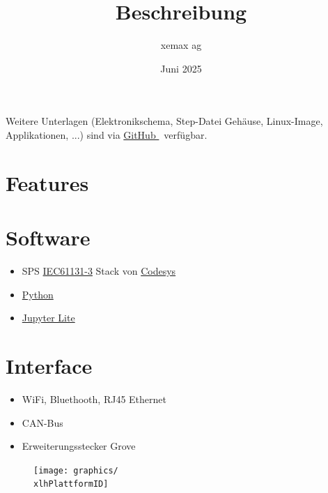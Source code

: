 \documentclass[10pt]{datasheet}
\title{Beschreibung \xlhPlattformID}
\author{xemax ag}
\date{Juni 2025}
\begin{document}
\maketitle





Weitere Unterlagen (Elektronikschema, Step-Datei Gehäuse, Linux-Image, Applikationen, ...) sind via
\href{https://github.com/xemax-ag/xLH/}{GitHub \xlhPlattformID}\ verfügbar.

\section{Features}


\section{Software}

\begin{itemize}
    \item SPS \href{https://de.wikipedia.org/wiki/EN_61131}{IEC61131-3} Stack von \href{https://www.codesys.com/}{Codesys}
    \item \href{https://www.python.org/}{Python}
    \item \href{https://jupyter.org/try-jupyter/lab/}{Jupyter Lite}
\end{itemize}

\section{Interface}

\begin{itemize}
    \item WiFi, Bluethooth, RJ45 Ethernet
    \item CAN-Bus
    \item Erweiterungsstecker Grove
\end{itemize}

\vfill\break

\begin{figure}[h]
    \centering
    \texttt{[image: graphics/\\xlhPlattformID]}
\end{figure}
\end{document}
